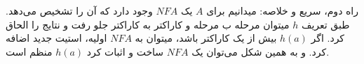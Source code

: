راه دوم، سریع و خلاصه:
\newline
میدانیم برای $A$ یک $NFA$ وجود دارد که آن را تشخیص می‌دهد. طبق تعریف $h$ میتوان مرحله ب مرحله و کاراکتر به کاراکتر جلو رفت و نتایج را الحاق کرد. اگر $h(a)$ بیش از یک کاراکتر باشد، میتوان به $NFA$ اولیه، استیت جدید اضافه کرد. و به همین شکل می‌توان یک $NFA$ ساخت و اثبات کرد $h(a)$ منظم است.
